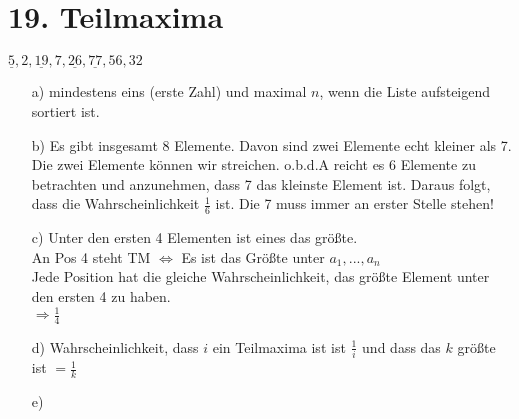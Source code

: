 \documentclass[ngerman,a4paper]{report}
\begin{document}
\section*{19. Teilmaxima}
$\underline{5},2,\underline{19},7,\underline{26},\underline{77},56,32$
\begin{enumerate}
\item[a)] mindestens eins (erste Zahl) und maximal $n$, wenn die Liste aufsteigend sortiert ist.
\item[b)] Es gibt insgesamt 8 Elemente. Davon sind zwei Elemente echt kleiner als 7. Die zwei Elemente können wir streichen. o.b.d.A reicht es 6 Elemente zu betrachten und anzunehmen, dass 7 das kleinste Element ist. Daraus folgt, dass die Wahrscheinlichkeit $\frac{1}{6}$ ist. Die 7 muss immer an erster Stelle stehen!\\
\item[c)] Unter den ersten 4 Elementen ist eines das größte.\\
An Pos 4 steht TM $\Leftrightarrow$ Es ist das Größte unter $a_1,...,a_n$\\
Jede Position hat die gleiche Wahrscheinlichkeit, das größte Element unter den ersten 4 zu haben.\\
$\Rightarrow \frac{1}{4}$\\
\item[d)] Wahrscheinlichkeit, dass $i$ ein Teilmaxima ist ist $\frac{1}{i}$ und dass das $k$ größte ist $=\frac{1}{k}$\\
\item[e)] 
\end{enumerate}
\end{document}
